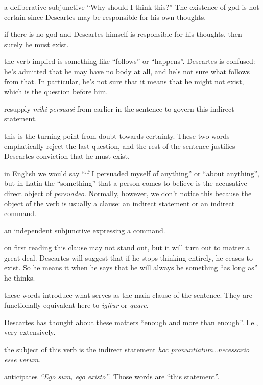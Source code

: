  a deliberative subjunctive ``Why should I think this?'' The existence of god is not certain since Descartes may be responsible for his own thoughts.

 if there is no god and Descartes himself is responsible for his thoughts, then surely he must exist.

 the verb implied is something like ``follows'' or ``happens''. Descartes is confused: he's admitted that he may have no body at all, and he's not sure what follows from that. In particular, he's not sure that it means that he might not exist, which is the question before him.

 resupply \textit{mihi persuasi} from earlier in the sentence to govern this indirect statement.

 this is the turning point from doubt towards certainty. These two words emphatically reject the last question, and the rest of the sentence justifies Descartes conviction that he must exist.

 in English we would say ``if I persuaded myself of anything'' or ``about anything'', but in Latin the ``something'' that a person comes to believe is the accusative direct object of \textit{persuadeo}. Normally, however, we don't notice this because the object of the verb is usually a clause: an indirect statement or an indirect command.

 an independent subjunctive expressing a command.

 on first reading this clause may not stand out, but it will turn out to matter a great deal. Descartes will suggest that if he stops thinking entirely, he ceases to exist. So he means it when he says that he will always be something ``as long as'' he thinks.

 these words introduce what serves as the main clause of the sentence. They are functionally equivalent here to \textit{igitur} or \textit{quare}.

 Descartes has thought about these matters ``enough and more than enough''. I.e., very extensively.

 the subject of this verb is the indirect statement \textit{hoc pronuntiatum\dots necessario esse verum}.

 anticipates \textit{``Ego sum, ego existo''}. Those words are ``this statement''.

